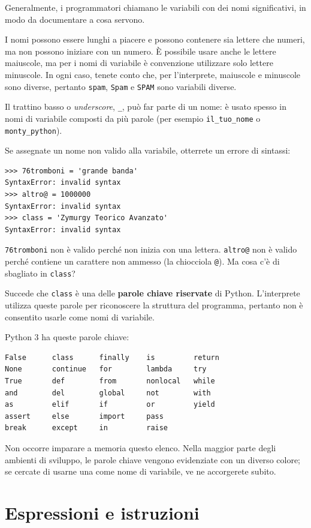 \documentclass[10pt]{book}
\begin{document}
Generalmente, i programmatori chiamano le variabili con dei nomi significativi, in modo da documentare a cosa servono.

I nomi possono essere lunghi a piacere e possono contenere sia lettere che numeri, ma non possono iniziare con un numero. È possibile usare anche le lettere maiuscole, ma per i nomi di variabile è convenzione utilizzare solo lettere minuscole. In ogni caso, tenete conto che, per l'interprete, maiuscole e minuscole sono diverse, pertanto \verb"spam", \verb"Spam" e \verb"SPAM" sono variabili diverse.

Il trattino basso o {\em underscore}, \verb"_", può far parte di un nome: è usato spesso in nomi di variabile composti da più parole (per esempio 
\verb"il_tuo_nome" o \verb"monty_python").

Se assegnate un nome non valido alla variabile, otterrete un errore di sintassi:

\begin{verbatim}
>>> 76tromboni = 'grande banda'
SyntaxError: invalid syntax
>>> altro@ = 1000000
SyntaxError: invalid syntax
>>> class = 'Zymurgy Teorico Avanzato'
SyntaxError: invalid syntax
\end{verbatim}
%
{\tt 76tromboni} non è valido perché non inizia con una lettera.
{\tt altro@} non è valido perché contiene un carattere non ammesso (la chiocciola {\tt @}). Ma cosa c'è di sbagliato in {\tt class}?

Succede che {\tt class} è una delle {\bf parole chiave riservate} di Python. L'interprete utilizza queste parole per riconoscere la struttura del programma, pertanto non è consentito usarle come nomi di variabile.

Python 3 ha queste parole chiave:

\begin{verbatim}
False      class      finally    is         return
None       continue   for        lambda     try
True       def        from       nonlocal   while
and        del        global     not        with
as         elif       if         or         yield
assert     else       import     pass
break      except     in         raise
\end{verbatim}
%
Non occorre imparare a memoria questo elenco. Nella maggior parte degli ambienti di sviluppo, le parole chiave vengono evidenziate con un diverso colore; se cercate di usarne una come nome di variabile, ve ne accorgerete subito.


\section{Espressioni e istruzioni}
\end{document}
